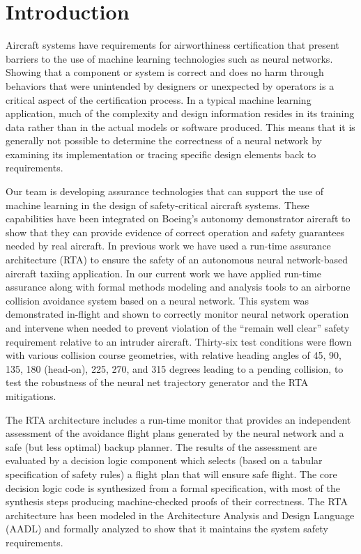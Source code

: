\section{Introduction}

Aircraft systems have requirements for airworthiness certification that present barriers to the use
of machine learning technologies such as neural networks. Showing that a component or system is
correct and does no harm through behaviors that were unintended by designers or unexpected by
operators is a critical aspect of the certification process. In a typical machine learning
application, much of the complexity and design information resides in its training data rather than
in the actual models or software produced. This means that it is generally not possible to determine
the correctness of a neural network by examining its implementation or tracing specific design
elements back to requirements.

Our team is developing assurance technologies that can support the use of machine learning in the
design of safety-critical aircraft systems. These capabilities have been integrated on Boeing’s
autonomy demonstrator aircraft to show that they can provide evidence of correct operation and
safety guarantees needed by real aircraft. In previous work \cite{dasc2020} we have used a run-time assurance
architecture (RTA) to ensure the safety of an autonomous neural network-based aircraft taxiing
application. In our current work we have applied run-time assurance along with formal methods
modeling and analysis tools to an airborne collision avoidance system based on a neural network.
This system was demonstrated in-flight and shown to correctly monitor neural network operation and
intervene when needed to prevent violation of the “remain well clear” safety requirement relative to
an intruder aircraft. Thirty-six test conditions were flown with various collision course
geometries, with relative heading angles of 45, 90, 135, 180 (head-on), 225, 270, and 315 degrees
leading to a pending collision, to test the robustness of the neural net trajectory generator and
the RTA mitigations.

The RTA architecture includes a run-time monitor that provides an independent assessment of the
avoidance flight plans generated by the neural network and a safe (but less optimal) backup planner.
The results of the assessment are evaluated by a decision logic component which selects (based on a
tabular specification of safety rules) a flight plan that will ensure safe flight. The core decision
logic code is synthesized from a formal specification, with most of the synthesis steps producing
machine-checked proofs of their correctness. The RTA architecture has been modeled in the
Architecture Analysis and Design Language (AADL) and formally analyzed to show that it maintains the
system safety requirements.

